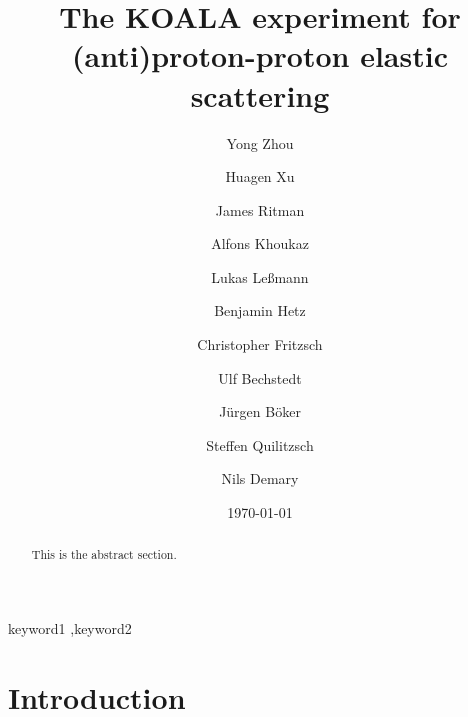 \documentclass[number]{elsarticle}
\begin{document}
\begin{frontmatter}	
  \title{The KOALA experiment for (anti)proton-proton elastic scattering}
  \date{\today}

  \author[ikp]{Yong Zhou}
  \author[ikp]{Huagen Xu}
  \author[ikp,bochum]{James Ritman}

  \author[muenster]{Alfons Khoukaz}
  \author[muenster]{Lukas Leßmann}
  \author[muenster]{Benjamin Hetz}
  \author[muenster]{Christopher Fritzsch}

  \author[ikp]{Ulf Bechstedt}
  \author[ikp]{Jürgen Böker}
  \author[ikp]{Steffen Quilitzsch}
  \author[ikp]{Nils Demary}





  \address[ikp]{Institut für Kernphysik, Forschungszentrum Jülich, Jülich, 52425, Germany}
  \address[muenster]{Institut für Kernphysik, Universität Münster, Münster, 48149, Germany}
  \address[zea]{Zentralinstitut für Engineering, Elektronik und Analytik, Forschungszentrum Jülich, Jülich, 52425, Germany}
  \address[bochum]{Ruhr-Universität Bochum, Bochum, 44780, Germany}


  \begin{abstract}
    This is the abstract section.
    \lipsum[1]
  \end{abstract}

  \begin{keyword}
    keyword1 \sep keyword2
  \end{keyword}

\end{frontmatter}


\tableofcontents
\newpage

\section{Introduction}
\label{sec:introduction}
\end{document}
